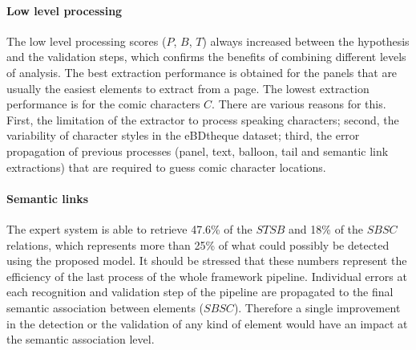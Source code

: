
\paragraph{Low level processing} %
\label{par:low_level_processing}

The low level processing scores ($P$, $B$, $T$) always increased between the hypothesis and the validation steps, which confirms the benefits of combining different levels of analysis.
The best extraction performance is obtained for the panels that are usually the easiest elements to extract from a page.
The lowest extraction performance is for the comic characters $C$.
There are various reasons for this.
First, the limitation of the extractor to process speaking characters; second, the variability of character styles in the eBDtheque dataset; third, the error propagation of previous processes (panel, text, balloon, tail and semantic link extractions) that are required to guess comic character locations.


\paragraph{Semantic links} %
\label{sec:semantic_links_evaluation}

The expert system is able to retrieve 47.6\% of the $STSB$ and 18\% of the $SBSC$ relations, which represents more than 25\% of what could possibly be detected using the proposed model.
It should be stressed that these numbers represent the efficiency of the last process of the whole framework pipeline.
Individual errors at each recognition and validation step of the pipeline are propagated to the final semantic association between elements ($SBSC$).
Therefore a single improvement in the detection or the validation of any kind of element would have an impact at the semantic association level.

